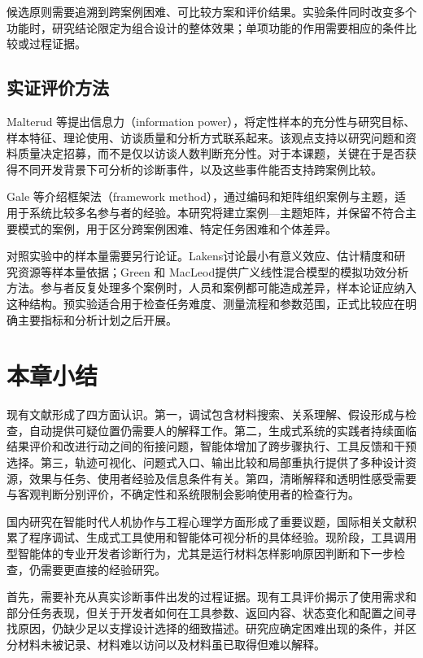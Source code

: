 候选原则需要追溯到跨案例困难、可比较方案和评价结果。实验条件同时改变多个功能时，研究结论限定为组合设计的整体效果；单项功能的作用需要相应的条件比较或过程证据。

\subsection{实证评价方法}

Malterud 等\cite{malterud2016information}提出信息力（information power），将定性样本的充分性与研究目标、样本特征、理论使用、访谈质量和分析方式联系起来。该观点支持以研究问题和资料质量决定招募，而不是仅以访谈人数判断充分性。对于本课题，关键在于是否获得不同开发背景下可分析的诊断事件，以及这些事件能否支持跨案例比较。

Gale 等\cite{gale2013framework}介绍框架法（framework method），通过编码和矩阵组织案例与主题，适用于系统比较多名参与者的经验。本研究将建立案例—主题矩阵，并保留不符合主要模式的案例，用于区分跨案例困难、特定任务困难和个体差异。

对照实验中的样本量需要另行论证。Lakens\cite{ref67}讨论最小有意义效应、估计精度和研究资源等样本量依据；Green 和 MacLeod\cite{ref68}提供广义线性混合模型的模拟功效分析方法。参与者反复处理多个案例时，人员和案例都可能造成差异，样本论证应纳入这种结构。预实验适合用于检查任务难度、测量流程和参数范围，正式比较应在明确主要指标和分析计划之后开展。

\section{本章小结}



现有文献形成了四方面认识。第一，调试包含材料搜索、关系理解、假设形成与检查，自动提供可疑位置仍需要人的解释工作。第二，生成式系统的实践者持续面临结果评价和改进行动之间的衔接问题，智能体增加了跨步骤执行、工具反馈和干预选择。第三，轨迹可视化、问题式入口、输出比较和局部重执行提供了多种设计资源，效果与任务、使用者经验及信息条件有关。第四，清晰解释和透明性感受需要与客观判断分别评价，不确定性和系统限制会影响使用者的检查行为。

国内研究在智能时代人机协作与工程心理学方面形成了重要议题，国际相关文献积累了程序调试、生成式工具使用和智能体可视分析的具体经验。现阶段，工具调用型智能体的专业开发者诊断行为，尤其是运行材料怎样影响原因判断和下一步检查，仍需要更直接的经验研究。



首先，需要补充从真实诊断事件出发的过程证据。现有工具评价揭示了使用需求和部分任务表现，但关于开发者如何在工具参数、返回内容、状态变化和配置之间寻找原因，仍缺少足以支撑设计选择的细致描述。研究应确定困难出现的条件，并区分材料未被记录、材料难以访问以及材料虽已取得但难以解释。


